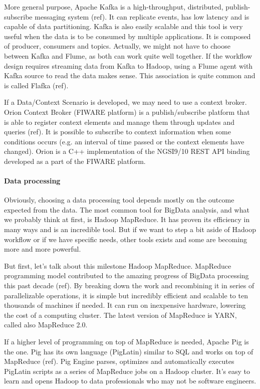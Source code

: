 More general purpose, Apache Kafka is a high-throughput, distributed, publish-subscribe messaging system (ref).
It can replicate events, has low latency and is capable of data partitioning. Kafka is also easily scalable and this tool is very useful when the data is to be consumed by multiple applications. It is composed of producer, consumers and topics.
Actually, we might not have to choose between Kafka and Flume, as both can work quite well together.
If the workflow design requires streaming data from Kafka to Hadoop, using a Flume agent with Kafka source to read the data makes sense.
This association is quite common and is called Flafka (ref).

If a Data/Context Scenario is developed, we may need to use a context broker.
Orion Context Broker (FIWARE platform) is a publish/subscribe platform that is able to register context elements and manage them through updates and queries (ref).
It is possible to subscribe to context information when some conditions occurs (e.g. an interval of time passed or the context elements have changed).
Orion is a C++ implementation of the NGSI9/10 REST API binding developed as a part of the FIWARE platform.

\paragraph{Data processing}

Obviously, choosing a data processing tool depends mostly on the outcome expected from the data.
The most common tool for BigData analysis, and what we probably think at first, is Hadoop MapReduce.
It has proven its efficiency in many ways and is an incredible tool.
But if we want to step a bit aside of Hadoop workflow or if we have specific needs, other tools exists and some are becoming more and more powerful.

But first, let’s talk about this milestone Hadoop MapReduce.
MapReduce programming model contributed to the amazing progress of BigData processing this past decade (ref).
By breaking down the work and recombining it in series of parallelizable operations, it is simple but incredibly efficient and scalable to ten thousands of machines if needed.
It can run on inexpensive hardware, lowering the cost of a computing cluster.
The latest version of MapReduce is YARN, called also MapReduce 2.0.

If a higher level of programming on top of MapReduce is needed, Apache Pig is the one.
Pig has its own language (PigLatin) similar to SQL and works on top of MapReduce (ref).
Pig Engine parses, optimizes and automatically executes PigLatin scripts as a series of MapReduce jobs on a Hadoop cluster.
It’s easy to learn and opens Hadoop to data professionals who may not be software engineers.

